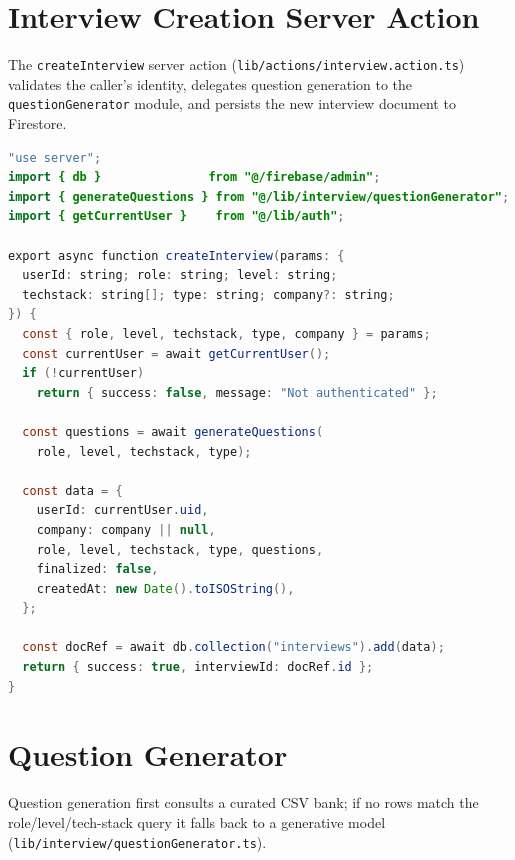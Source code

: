 \section{Interview Creation Server Action}
\label{app:interview-create}

The \texttt{createInterview} server action (\texttt{lib/actions/interview.action.ts})
validates the caller's identity, delegates question generation to the
\texttt{questionGenerator} module, and persists the new interview document to
Firestore.

\begin{lstlisting}[language=Java,
  caption={Interview creation server action
           (\texttt{lib/actions/interview.action.ts})},
  label={lst:createInterview}]
"use server";
import { db }               from "@/firebase/admin";
import { generateQuestions } from "@/lib/interview/questionGenerator";
import { getCurrentUser }    from "@/lib/auth";

export async function createInterview(params: {
  userId: string; role: string; level: string;
  techstack: string[]; type: string; company?: string;
}) {
  const { role, level, techstack, type, company } = params;
  const currentUser = await getCurrentUser();
  if (!currentUser)
    return { success: false, message: "Not authenticated" };

  const questions = await generateQuestions(
    role, level, techstack, type);

  const data = {
    userId: currentUser.uid,
    company: company || null,
    role, level, techstack, type, questions,
    finalized: false,
    createdAt: new Date().toISOString(),
  };

  const docRef = await db.collection("interviews").add(data);
  return { success: true, interviewId: docRef.id };
}
\end{lstlisting}

\section{Question Generator}
\label{app:qgen}

Question generation first consults a curated CSV bank; if no rows match the
role/level/tech-stack query it falls back to a generative model
(\texttt{lib/interview/questionGenerator.ts}).

